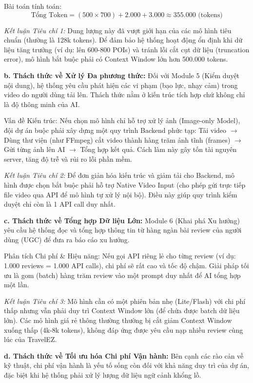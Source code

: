 Bài toán tính toán:
\begin{equation}
\text{Tổng Token} = (500 \times 700) + 2.000 + 3.000 \approx 355.000 \text{ (tokens)}
\end{equation}

\textit{Kết luận Tiêu chí 1:} Dung lượng này đã vượt giới hạn của các mô hình tiêu chuẩn (thường là 128k tokens). Để đảm bảo hệ thống hoạt động ổn định khi dữ liệu tăng trưởng (ví dụ: lên 600-800 POIs) và tránh lỗi cắt cụt dữ liệu (truncation error), mô hình bắt buộc phải có Context Window lớn hơn 500.000 tokens.

\textbf{b. Thách thức về Xử lý Đa phương thức:} Đối với Module 5 (Kiểm duyệt nội dung), hệ thống yêu cầu phát hiện các vi phạm (bạo lực, nhạy cảm) trong video do người dùng tải lên. Thách thức nằm ở kiến trúc tích hợp chứ không chỉ là độ thông minh của AI.

Vấn đề Kiến trúc: Nếu chọn mô hình chỉ hỗ trợ xử lý ảnh (Image-only Model), đội dự án buộc phải xây dựng một quy trình Backend phức tạp: Tải video $\rightarrow$ Dùng thư viện (như FFmpeg) cắt video thành hàng trăm ảnh tĩnh (frames) $\rightarrow$ Gửi từng ảnh lên AI $\rightarrow$ Tổng hợp kết quả. Cách làm này gây tốn tài nguyên server, tăng độ trễ và rủi ro lỗi phần mềm.

\textit{Kết luận Tiêu chí 2:} Để đơn giản hóa kiến trúc và giảm tải cho Backend, mô hình được chọn bắt buộc phải hỗ trợ Native Video Input (cho phép gửi trực tiếp file video qua API để mô hình tự xử lý nội bộ). Điều này giúp quy trình kiểm duyệt chỉ còn là 1 API call duy nhất.

\textbf{c. Thách thức về Tổng hợp Dữ liệu Lớn:} Module 6 (Khai phá Xu hướng) yêu cầu hệ thống đọc và tổng hợp thông tin từ hàng ngàn bài review của người dùng (UGC) để đưa ra báo cáo xu hướng.

Phân tích Chi phí \& Hiệu năng: Nếu gọi API riêng lẻ cho từng review (ví dụ: 1.000 reviews = 1.000 API calls), chi phí sẽ rất cao và tốc độ chậm. Giải pháp tối ưu là gom (batch) hàng trăm review vào một prompt duy nhất để AI tổng hợp một lần.

\textit{Kết luận Tiêu chí 3:} Mô hình cần có một phiên bản nhẹ (Lite/Flash) với chi phí thấp nhưng vẫn phải duy trì Context Window lớn (để chứa được batch dữ liệu lớn). Các mô hình giá rẻ thông thường thường bị cắt giảm Context Window xuống thấp (4k-8k tokens), không đáp ứng được yêu cầu nạp nhiều review cùng lúc của TravelEZ.

\textbf{d. Thách thức về Tối ưu hóa Chi phí Vận hành:} Bên cạnh các rào cản về kỹ thuật, chi phí vận hành là yếu tố sống còn đối với khả năng duy trì của dự án, đặc biệt khi hệ thống phải xử lý lượng dữ liệu ngữ cảnh khổng lồ.

